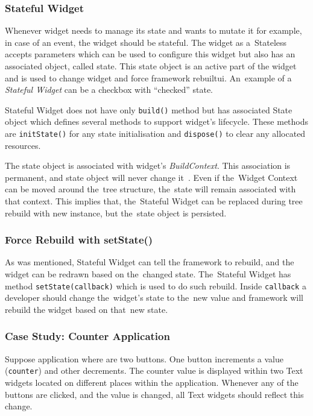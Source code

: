 \subsubsection{Stateful Widget}
Whenever widget needs to manage its state and wants to mutate it for example, in case of an event, the widget should be stateful.  The widget as a~Stateless accepts parameters which can be used to configure this widget but also has an associated object, called state. This state object is an active part of the widget and is used to change widget and force framework rebuilt\gls{ui}. An~example of a \textit{Stateful Widget} can be a checkbox with ``checked'' state. 

Stateful Widget does not have only \verb|build()| method but has associated State object which defines several methods to support widget's lifecycle. These methods are \verb|initState()| for any state initialisation and \verb|dispose()| to clear any allocated resources. 

The state object is associated with widget's \textit{BuildContext}. This association is permanent, and state object will never change it~\cite{notion-widget-didier}. Even if the~Widget Context can be moved around the~tree structure, the~state will remain associated with that context. This implies that, the~Stateful Widget can be replaced during tree rebuild with new instance, but the~state object is persisted. 
\subsubsection{Force Rebuild with setState()}
As was mentioned, Stateful Widget can tell the framework to rebuild, and the widget can be redrawn based on the~changed state. The~Stateful Widget has method \verb|setState(callback)| which is used to do such rebuild. Inside \verb|callback| a developer should change the~widget's state to the~new value and framework will rebuild the widget based on that~new state. 
\subsubsection{Case Study: Counter Application}
Suppose application where are two buttons. One button increments a value (\verb|counter|) and other decrements. The counter value is displayed within two Text widgets located on different places within the application. Whenever any of the buttons are clicked, and the value is changed, all Text widgets should reflect this change.

